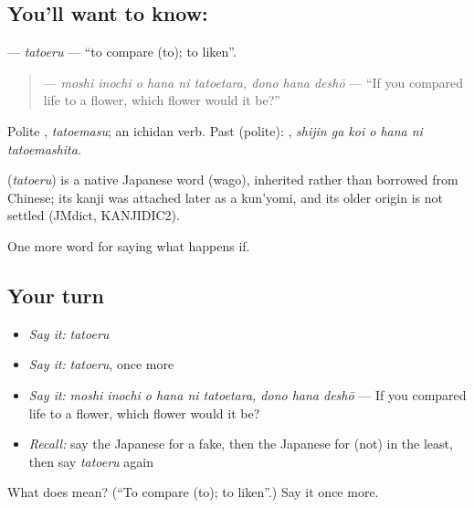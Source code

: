 \subsection*{You'll want to know: }
\textbf{} — \emph{tatoeru} — \textquotedblleft{}to compare (to); to liken\textquotedblright{}.

\begin{quote}
\textbf{    } — \emph{moshi inochi o hana ni tatoetara, dono hana deshō} — \textquotedblleft{}If you compared life to a flower, which flower would it be?\textquotedblright{}
\end{quote}

Polite \textbf{}, \emph{tatoemasu}; an ichidan verb. Past (polite): \textbf{   }, \emph{shijin ga koi o hana ni tatoemashita}.

\begin{cousinweb}
\textbf{} (\emph{tatoeru}) is a native Japanese word (wago), inherited rather than borrowed from Chinese; its kanji was attached later as a kun'yomi, and its older origin is not settled (JMdict, KANJIDIC2).
\end{cousinweb}

\begin{grammarlens}[title={What you've built}]
One more word for saying what happens if.
\end{grammarlens}

\subsection*{Your turn}
\begin{itemize}
\raggedright
  \item \emph{Say it:} \emph{tatoeru}
  \item \emph{Say it:} \emph{tatoeru}, once more
  \item \emph{Say it:} \emph{moshi inochi o hana ni tatoetara, dono hana deshō} — If you compared life to a flower, which flower would it be?
  \item \emph{Recall:} say the Japanese for a fake, then the Japanese for (not) in the least, then say \emph{tatoeru} again
\end{itemize}

\begin{tcolorbox}[breakable,colback=teal!4,colframe=teal!35!black,title={Before you move on}]
What does  mean? (\textquotedblleft{}To compare (to); to liken\textquotedblright{}.) Say it once more.
\end{tcolorbox}
